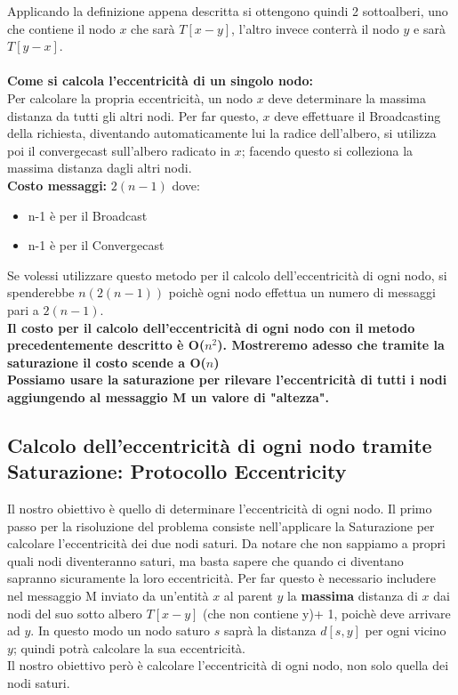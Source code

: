 Applicando la definizione appena descritta si ottengono quindi 2 sottoalberi,
uno che contiene il nodo $x$ che sarà $T[x - y]$, l'altro invece conterrà il
nodo $y$ e sarà $T[y - x]$. \\\\
\textbf{Come si calcola l'eccentricità di un singolo nodo:}\\
Per calcolare la propria eccentricità, un nodo $x$ deve determinare la massima
distanza da tutti gli altri nodi. Per far questo, $x$ deve effettuare il
Broadcasting della richiesta, diventando automaticamente lui la radice
dell'albero, si utilizza poi il convergecast sull'albero radicato in $x$;
facendo questo si colleziona la massima distanza dagli altri nodi.\\
\textbf{Costo messaggi:} $2(n-1)$ dove:
\begin{itemize}
    \item n-1 è  per il Broadcast
    \item n-1 è per il Convergecast
\end{itemize}
Se volessi utilizzare questo metodo per il calcolo dell'eccentricità di ogni
nodo, si spenderebbe $n(2(n-1))$ poichè ogni nodo effettua un numero di messaggi
pari a $2(n-1)$.\\

\textbf{Il costo per il calcolo dell'eccentricità di ogni nodo con il metodo
    precedentemente descritto è O($n^2$). Mostreremo adesso che tramite la
    saturazione il costo scende a O($n$)}\\

\textbf{Possiamo usare la saturazione per rilevare l'eccentricità di tutti i nodi aggiungendo al messaggio M un valore di "altezza".}

\subsection{Calcolo dell'eccentricità di ogni nodo tramite Saturazione: Protocollo Eccentricity}
Il nostro obiettivo è quello di determinare l'eccentricità di ogni nodo. Il
primo passo per la risoluzione del problema consiste nell'applicare la
Saturazione per calcolare l'eccentricità dei due nodi saturi. Da notare che non
sappiamo a propri quali nodi diventeranno saturi, ma basta sapere che quando ci
diventano sapranno sicuramente la loro eccentricità. Per far questo è necessario
includere nel messaggio M inviato da un'entità $x$ al parent $y$ la
\textbf{massima} distanza di $x$ dai nodi del suo sotto albero $T[x-y]$ (che non
contiene y)+ 1, poichè deve arrivare ad $y$. In questo modo un nodo saturo $s$
saprà la distanza $d[s,y]$ per ogni vicino $y$; quindi potrà calcolare la sua
eccentricità. \\
Il nostro obiettivo però è calcolare l'eccentricità di ogni nodo, non solo
quella dei nodi saturi.\\

